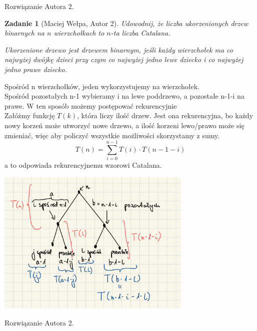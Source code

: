 \documentclass{mwart}
\newtheorem{zad}{Zadanie}[section]
\begin{document}
\begin{mdframed}
    Rozwiązanie Autora 2.
\end{mdframed}




\begin{zad}[Maciej Wełpa, Autor 2]
    Udowodnij, że liczba ukorzenionych drzew binarnych na $n$ wierzchołkach to $n$-ta liczba Catalana.

    Ukorzenione drzewo jest drzewem binarnym, jeśli każdy wierzchołek ma co najwyżej
    dwójkę dzieci przy czym co najwyżej jedno lewe dziecko i co najwyżej jedno prawe dziecko.
\end{zad}
\begin{mdframed}
    Spośród n wierzchołków, jeden wykorzystujemy na wierzchołek.\\
    Spośród pozostałych n-1 wybieramy i na lewe poddrzewo, a pozostałe n-1-i na prawe. W ten sposób możemy postępować rekurencyjnie\\
    Załóżmy funkcję \( T(k) \), która liczy ilość drzew. Jest ona rekurencyjna, bo każdy nowy korzeń może utworzyć nowe drzewo, a ilość korzeni lewo/prawo może się zmieniać, więc aby policzyć wszystkie możliwości skorzystamy z sumy.
    \[
    T(n) = \sum_{i=0}^{n-1} T(i) \cdot T(n-1-i)
    \]
    a to odpowiada rekurencyjnemu wzorowi Catalana.
    \begin{center}
    \includegraphics[width=0.7\textwidth]{images/zad36.jpeg}
\end{center}

\end{mdframed}
\begin{mdframed}
    Rozwiązanie Autora 2.
\end{mdframed}
\end{document}
